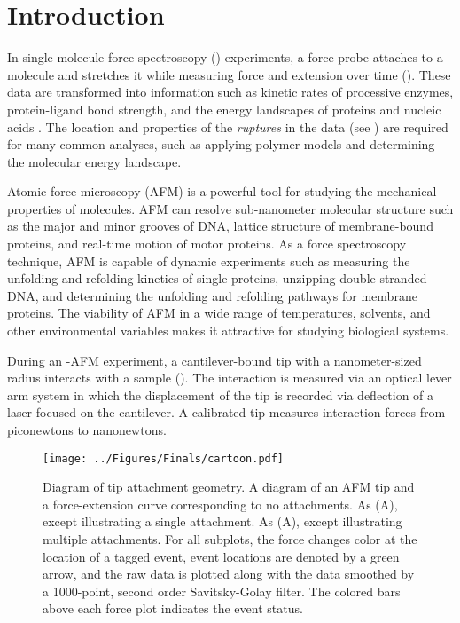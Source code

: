 \chapter{Introduction}
In single-molecule force spectroscopy (\singlemol{}) experiments, a force probe attaches to a molecule and stretches it while measuring force and extension over time (). These data are transformed into information such as kinetic rates of processive enzymes, protein-ligand bond strength,  and the energy landscapes of proteins and nucleic acids . The location and properties of the \textit{ruptures} in the data (see ) are required for many common \singlemol{} analyses, such as applying polymer models and determining the molecular energy landscape.

Atomic force microscopy (AFM) is a powerful tool for studying the mechanical properties of molecules.  AFM can resolve sub-nanometer molecular structure such as the major and minor grooves of DNA, lattice structure of membrane-bound proteins, and real-time motion of motor proteins. As a force spectroscopy technique, AFM is capable of dynamic experiments such as measuring the unfolding and refolding kinetics of single proteins, unzipping double-stranded DNA, and determining the unfolding and refolding pathways for membrane proteins. The viability of AFM in a wide range of temperatures, solvents, and other environmental variables makes it attractive for studying biological systems. 

During an \singlemol{}-AFM experiment, a cantilever-bound tip with a nanometer-sized radius interacts with a sample (). The interaction is measured via an optical lever arm system\cite{meyer_novel_1998} in which the displacement of the tip is recorded via deflection of a laser focused on the cantilever. A calibrated tip measures interaction forces from piconewtons to nanonewtons. 

\begin{figure}[htpb]
\caption[Diagram of AFM attachment geometry]{Diagram of tip attachment geometry.  A diagram of an AFM tip and a force-extension curve corresponding to no attachments.  As (A), except illustrating a single attachment.  As (A), except illustrating multiple attachments. For all subplots, the force changes color at the location of a tagged event, event locations are denoted by a green arrow, and the raw data is plotted along with the data smoothed by a 1000-point, second order Savitsky-Golay filter. The colored bars above each force plot indicates the event status.}
\centering
\texttt{[image: ../Figures/Finals/cartoon.pdf]}%
\end{figure}

